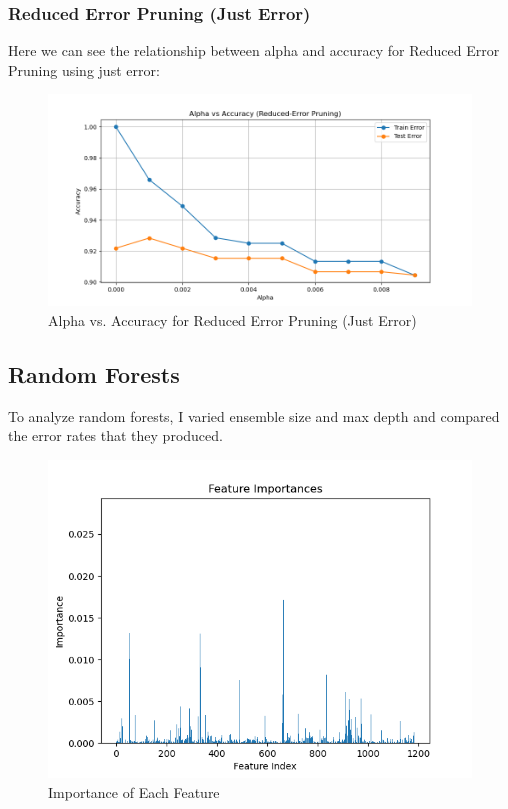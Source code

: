 \documentclass[12pt]{article}
\begin{document}
\subsubsection{Reduced Error Pruning (Just Error)}

Here we can see the relationship between alpha and accuracy for Reduced Error Pruning using just error:

\begin{figure}[h!]
    \centering
    \includegraphics[width=0.8\linewidth]{figures/Reduced Error Pruning/alpha vs accuracy.png}
    \caption{Alpha vs. Accuracy for Reduced Error Pruning (Just Error)}
    \label{fig:error}
\end{figure}

\subsection{Random Forests}

To analyze random forests, I varied ensemble size and max depth and compared the error rates that they produced.

\begin{figure}[h!]
    \centering
    \includegraphics[width=0.8\linewidth]{figures/Random Forests/Feature Importance.png}
    \caption{Importance of Each Feature}
    \label{fig:mcc}
\end{figure}
\end{document}
